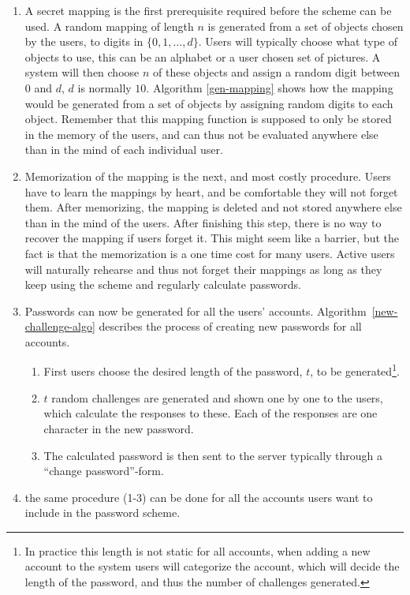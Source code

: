 \begin{enumerate}
    \item A secret mapping is the first prerequisite required before the scheme can be used. A random mapping of length $n$ is generated from a set of objects chosen by the users, to digits in $\{0,1,\dots,d\}$. Users will typically choose what type of objects to use, this can be an alphabet or a user chosen set of pictures. A system will then choose $n$ of these objects and assign a random digit between $0$ and $d$, $d$ is normally $10$. Algorithm \ref{gen-mapping} shows how the mapping would be generated from a set of objects by assigning random digits to each object. Remember that this mapping function is supposed to only be stored in the memory of the users, and can thus not be evaluated anywhere else than in the mind of each individual user.
    \item Memorization of the mapping is the next, and most costly procedure. Users have to learn the mappings by heart, and be comfortable they will not forget them. After memorizing, the mapping is deleted and not stored anywhere else than in the mind of the users. After finishing this step, there is no way to recover the mapping if users forget it. This might seem like a barrier, but the fact is that the memorization is a one time cost for many users. Active users will naturally rehearse and thus not forget their mappings as long as they keep using the scheme and regularly calculate passwords.
    \item Passwords can now be generated for all the users' accounts. Algorithm~\ref{new-challenge-algo} describes the process of creating new passwords for all accounts. 
    \begin{enumerate}
        \item First users choose the desired length of the password, $t$, to be generated\footnote{In practice this length is not static for all accounts, when adding a new account to the system users will categorize the account, which will decide the length of the password, and thus the number of challenges generated.}. 
        \item $t$ random challenges are generated and shown one by one to the users, which calculate the responses to these. Each of the responses are one character in the new password. 
        \item The calculated password is then sent to the server typically through a ``change password''-form. 
    \end{enumerate}
    \item the same procedure (1-3) can be done for all the accounts users want to include in the password scheme.
\end{enumerate}

